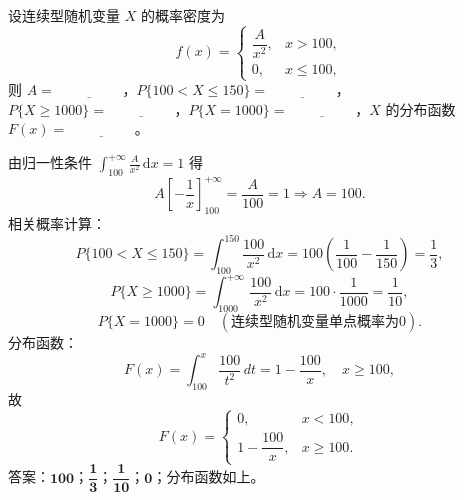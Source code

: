 \documentclass[lang=cn,11pt]{elegantbook}
\begin{document}
\begin{exercise}[连续型概率密度参数求解] \label{exer:2-37}
设连续型随机变量 $X$ 的概率密度为
\[
f(x)=
\begin{cases}
\dfrac{A}{x^2}, & x>100, \\[6pt]
0, & x\leqslant100,
\end{cases}
\]
则 $A=\underline{\hspace{2cm}}$，$P\{100<X\leqslant150\}=\underline{\hspace{2cm}}$，$P\{X\geqslant1000\}=\underline{\hspace{2cm}}$，$P\{X=1000\}=\underline{\hspace{2cm}}$，$X$ 的分布函数 $F(x)=\underline{\hspace{2cm}}$。
\end{exercise}

\begin{solution}
由归一性条件 $\displaystyle\int_{100}^{+\infty}\frac{A}{x^2}\,\mathrm{d}x=1$ 得
\[
A\left[-\frac{1}{x}\right]_{100}^{+\infty} = \frac{A}{100} = 1 \Rightarrow A=100.
\]
相关概率计算：
\[
P\{100<X\leqslant150\} = \int_{100}^{150}\frac{100}{x^2}\,\mathrm{d}x = 100\left(\frac{1}{100}-\frac{1}{150}\right) = \frac{1}{3},
\]
\[
P\{X\geqslant1000\} = \int_{1000}^{+\infty}\frac{100}{x^2}\,\mathrm{d}x = 100\cdot\frac{1}{1000} = \frac{1}{10},
\]
\[
P\{X=1000\}=0 \quad (\text{连续型随机变量单点概率为0}).
\]
分布函数：
\[
F(x) = \int_{100}^{x}\frac{100}{t^2}\,dt = 1-\frac{100}{x}, \quad x\geqslant100,
\]
故
\[
F(x)=
\begin{cases}
0, & x<100, \\[6pt]
1-\dfrac{100}{x}, & x\geqslant100.
\end{cases}
\]
答案：$\boldsymbol{100}$；$\boldsymbol{\dfrac{1}{3}}$；$\boldsymbol{\dfrac{1}{10}}$；$\boldsymbol{0}$；分布函数如上。
\end{solution}
\end{document}
